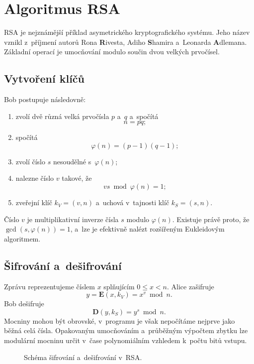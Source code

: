 \section{Algoritmus RSA}\label{sec:krypto-rsa}

RSA je nejznámější příklad asymetrického kryptografického systému. Jeho název vznikl z~příjmení autorů Rona \textbf{R}ivesta, Adiho \textbf{S}hamira a~Leonarda \textbf{A}dlemana. Základní operací je umocňování modulo součin dvou velkých prvočísel.

\subsection{Vytvoření klíčů}

Bob postupuje následovně:
\begin{enumerate}
    \item zvolí dvě různá velká prvočísla $p$ a~$q$ a~spočítá
    \[
        n=pq;
    \]
    \item spočítá
    \[
        \varphi(n)=(p-1)(q-1);
    \]
    \item zvolí číslo $s$ nesoudělné s~$\varphi(n)$;
    \item nalezne číslo $v$ takové, že
    \[
        vs\bmod\varphi(n)=1;
    \]
    \item zveřejní klíč $k_V=(v,n)$ a~uchová v~tajnosti klíč $k_S=(s,n)$.
\end{enumerate}

Číslo $v$ je multiplikativní inverze čísla $s$ modulo $\varphi(n)$. Existuje právě proto, že $\operatorname{gcd}(s,\varphi(n))=1$, a~lze je efektivně nalézt rozšířeným Eukleidovým algoritmem.


\subsection{Šifrování a~dešifrování}

Zprávu reprezentujeme číslem $x$ splňujícím $0\leqslant x<n$. Alice zašifruje
\[
    y=\mathbf{E}(x,k_V)=x^v\bmod n.
\]
Bob dešifruje
\[
    \mathbf{D}(y,k_S)=y^s\bmod n.
\]
Mocniny mohou být obrovské, v~programu je však nepočítáme nejprve jako běžná celá čísla. Opakovaným umocňováním a~průběžným výpočtem zbytku lze modulární mocninu určit v~čase polynomiálním vzhledem k~počtu bitů vstupu.

\begin{figure}[ht]
    \centering
    
    \caption{Schéma šifrování a~dešifrování v~RSA.}
    \label{fig:krypto-rsa-schema}
\end{figure}

